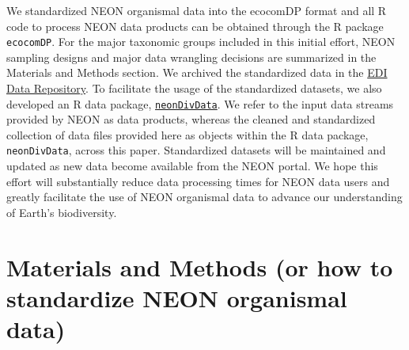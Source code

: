\documentclass[
  12pt,
]{article}
\begin{document}
We standardized NEON organismal data into the ecocomDP format and all R code to process NEON data products can be obtained through the R package \texttt{ecocomDP}. For the major taxonomic groups included in this initial effort, NEON sampling designs and major data wrangling decisions are summarized in the Materials and Methods section. We archived the standardized data in the \href{https://portal-s.edirepository.org/nis/mapbrowse?scope=edi\&identifier=190\&revision=2}{EDI Data Repository}. To facilitate the usage of the standardized datasets, we also developed an R data package, \href{https://github.com/daijiang/neonDivData}{\texttt{neonDivData}}. We refer to the input data streams provided by NEON as data products, whereas the cleaned and standardized collection of data files provided here as objects within the R data package, \texttt{neonDivData}, across this paper. Standardized datasets will be maintained and updated as new data become available from the NEON portal. We hope this effort will substantially reduce data processing times for NEON data users and greatly facilitate the use of NEON organismal data to advance our understanding of Earth's biodiversity.

\hypertarget{materials-and-methods-or-how-to-standardize-neon-organismal-data}{%
\section{Materials and Methods (or how to standardize NEON organismal data)}\label{materials-and-methods-or-how-to-standardize-neon-organismal-data}}
\end{document}
